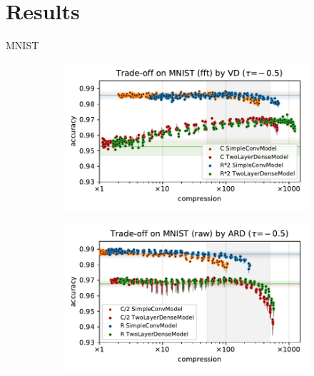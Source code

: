 \documentclass{beamer}
\begin{document}

\section{Results} %
\label{sec:results}

\begin{frame}[c]{\insertsection}{MNIST}
  \begin{figure}[t]
    \begin{subfigure}[b]{0.5\columnwidth}
      \centering
      \includegraphics[width=\linewidth]{figure__mnist-like__trade-off/appendix__cmp__VD__mnist__fft__-0.5.pdf}
    \end{subfigure}\hspace{-1em}%
    \begin{subfigure}[b]{0.5\columnwidth}
      \centering
      \includegraphics[width=\linewidth]{figure__mnist-like__trade-off/appendix__cmp__ARD__mnist__raw__-0.5.pdf}

\end{subfigure}
\end{figure}
\end{frame}
\end{document}
